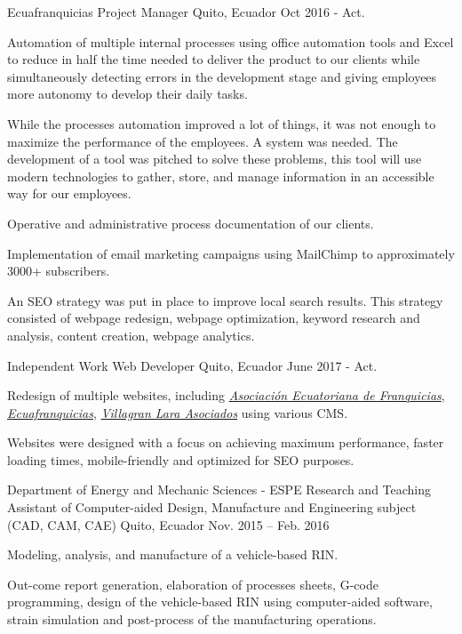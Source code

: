 
\begin{cventries}

  \cventry
    {Ecuafranquicias}
    {Project Manager}
    {Quito, Ecuador}
    {Oct 2016 - Act.}
    {
      \begin{cvitems}
        \item {Automation of multiple internal processes using oﬀice automation tools and Excel to reduce in half the time needed to deliver the product to our clients while simultaneously detecting errors in the development stage and giving employees more autonomy to develop their daily tasks.}
        \item {While the processes automation improved a lot of things, it was not enough to maximize the performance of the employees. A system was needed. The development of a tool was pitched to solve these problems, this tool will use modern technologies to gather, store, and manage information in an accessible way for our employees.}
        \item {Operative and administrative process documentation of our clients.}
        \item {Implementation of email marketing campaigns using MailChimp to approximately 3000+ subscribers.}
        \item {An SEO strategy was put in place to improve local search results. This strategy consisted of webpage redesign, webpage optimization, keyword research and analysis, content creation, webpage analytics.}
      \end{cvitems}
    }

    \cventry
      {Independent Work}
      {Web Developer}
      {Quito, Ecuador}
      {June 2017 - Act.}
      {
        \begin{cvitems}
          \item {Redesign of multiple websites, including \href{https://aefran.org}{\textit{Asociación Ecuatoriana de Franquicias}}, \href{http://www.ecuafranquicias.com}{\textit{Ecuafranquicias}}, \href{http://www.villagranlara.com}{\textit{Villagran Lara Asociados}} using various CMS.}
          \item {Websites were designed with a focus on achieving maximum performance, faster loading times, mobile-friendly and optimized for SEO purposes.}                       
        \end{cvitems} 
      }

  \cventry
    {Department of Energy and Mechanic Sciences - ESPE}
    {Research and Teaching Assistant of Computer-aided Design, Manufacture and Engineering subject (CAD, CAM, CAE)	}
    {Quito, Ecuador}
    {Nov. 2015 – Feb. 2016}
    {
      \begin{cvitems}
        \item {Modeling, analysis, and manufacture of a vehicle-based RIN.}
        \item {Out-come report generation, elaboration of processes sheets, G-code programming, design of the vehicle-based RIN using computer-aided software, strain simulation and post-process of the manufacturing operations.}
      \end{cvitems}
    }
  

\end{cventries}
